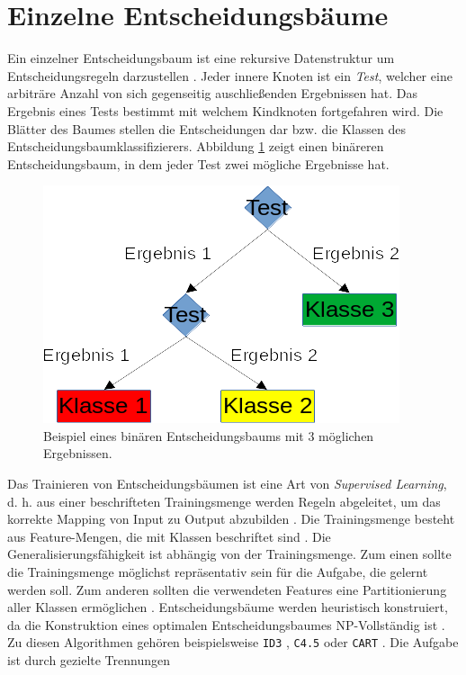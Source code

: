 \section{Einzelne Entscheidungsbäume}
\label{sec:dt_ind_decision_trees}
Ein einzelner Entscheidungsbaum ist eine rekursive Datenstruktur um Entscheidungsregeln darzustellen \cite{quinlan1990decision}.
Jeder innere Knoten ist ein \textit{Test}, welcher eine arbiträre Anzahl von sich gegenseitig auschließenden Ergebnissen hat.
Das Ergebnis eines Tests bestimmt mit welchem Kindknoten fortgefahren wird.
Die Blätter des Baumes stellen die Entscheidungen dar bzw. die Klassen des Entscheidungsbaumklassifizierers.
Abbildung \ref{fig:entscheidungsbaum} zeigt einen binäreren Entscheidungsbaum, in dem jeder Test zwei mögliche Ergebnisse hat.
\begin{figure}[h!]
    \centering
    \includegraphics[width=0.5\linewidth]{images/entscheidungsbaum.png}
    \caption{Beispiel eines binären Entscheidungsbaums mit 3 möglichen Ergebnissen.}
    \label{fig:entscheidungsbaum}
\end{figure}
Das Trainieren von Entscheidungsbäumen ist eine Art von \textit{Supervised Learning}, d. h. aus einer beschrifteten Trainingsmenge werden Regeln abgeleitet, um das korrekte Mapping von Input
zu Output abzubilden \cite{goshKMeans}. Die Trainingsmenge besteht aus Feature-Mengen, die mit Klassen beschriftet sind \cite{steinbergCART}. Die Generalisierungsfähigkeit ist abhängig von der
Trainingsmenge. Zum einen sollte die Trainingsmenge möglichst repräsentativ sein für die Aufgabe, die gelernt werden soll. Zum anderen sollten die verwendeten Features eine Partitionierung
aller Klassen ermöglichen \cite{pei1998feature}.
\newline
\newline
Entscheidungsbäume werden heuristisch konstruiert, da die Konstruktion eines optimalen Entscheidungsbaumes NP-Vollständig ist \cite{laurent1976constructing}. Zu diesen Algorithmen gehören
beispielsweise \texttt{ID3} \cite{quinlan1986induction}, \texttt{C4.5} \cite{quinlan2014c4} oder \texttt{CART} \cite{breiman1984classification}. Die Aufgabe ist durch gezielte Trennungen
